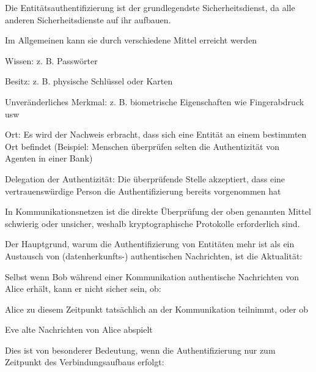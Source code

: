 \documentclass[a4paper]{article}
\begin{document}
\begin{multicols}{3}
      \begin{itemize*}
            \item Die Entitätsauthentifizierung ist der grundlegendste Sicherheitsdienst, da alle anderen Sicherheitsdienste auf ihr aufbauen.
            \item Im Allgemeinen kann sie durch verschiedene Mittel erreicht werden
            \begin{itemize*}
                  \item Wissen: z. B. Passwörter
                  \item Besitz: z. B. physische Schlüssel oder Karten
                  \item Unveränderliches Merkmal: z. B. biometrische Eigenschaften wie Fingerabdruck usw
                  \item Ort: Es wird der Nachweis erbracht, dass sich eine Entität an einem bestimmten Ort befindet (Beispiel: Menschen überprüfen selten die Authentizität von Agenten in einer Bank)
                  \item Delegation der Authentizität: Die überprüfende Stelle akzeptiert, dass eine vertrauenswürdige Person die Authentifizierung bereits vorgenommen hat
            \end{itemize*}
            \item In Kommunikationsnetzen ist die direkte Überprüfung der oben genannten Mittel schwierig oder unsicher, weshalb kryptographische Protokolle erforderlich sind.
            \item Der Hauptgrund, warum die Authentifizierung von Entitäten mehr ist als ein Austausch von (datenherkunfts-) authentischen Nachrichten, ist die Aktualität:
            \begin{itemize*}
                  \item Selbst wenn Bob während einer Kommunikation authentische Nachrichten von Alice erhält, kann er nicht sicher sein, ob:
                  \begin{itemize*}
                        \item Alice zu diesem Zeitpunkt tatsächlich an der Kommunikation teilnimmt, oder ob
                        \item Eve alte Nachrichten von Alice abspielt
                  \end{itemize*}
                  \item Dies ist von besonderer Bedeutung, wenn die Authentifizierung nur zum Zeitpunkt des Verbindungsaufbaus erfolgt:
                  \begin{itemize*}

\end{itemize*}
\end{itemize*}
\end{itemize*}
\end{multicols}
\end{document}
